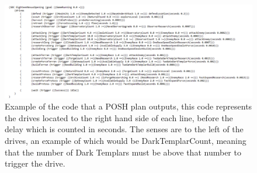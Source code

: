 \documentclass[journal]{IEEEtran}
\begin{document}
\begin{figure}
	\centering
	\includegraphics[width=\textwidth]{PlanCode}
	\caption{Example of the code that a POSH plan outputs, this code represents the drives located to the right hand side of each line, before the delay which is counted in seconds. The senses are to the left of the drives, an example of which would be DarkTemplarCount, meaning that the number of Dark Templars must be above that number to trigger the drive.}
	\label{figure10}
\end{figure}
	
\end{document}
